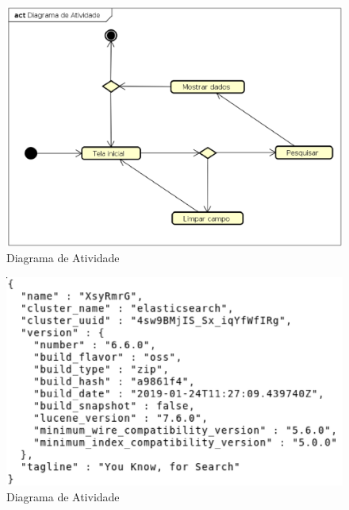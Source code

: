 \begin{figure}[!htb]
        \caption{\label{diagrama1}Diagrama de Atividade}
        \begin{center}
                \includegraphics[width=\textwidth]{imagens/teste.eps}
        \end{center}
\end{figure}


\begin{figure}[!htb]
        \caption{\label{diagrama1}Diagrama de Atividade}
        \begin{center}
                \includegraphics[angle=90, width=\textwidth, height=\textheight]{imagens/pretty.eps}
        \end{center}
\end{figure}
